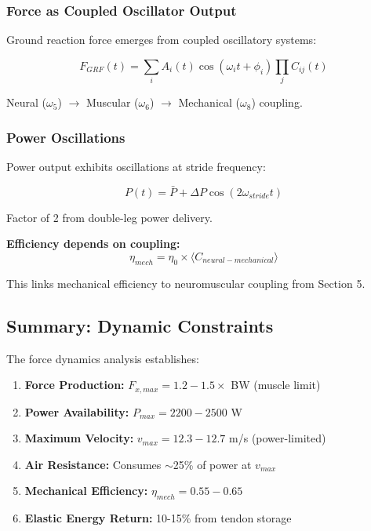 \subsubsection{Force as Coupled Oscillator Output}

Ground reaction force emerges from coupled oscillatory systems:

\begin{equation}
F_{GRF}(t) = \sum_i A_i(t) \cos(\omega_i t + \phi_i) \prod_{j} C_{ij}(t)
\label{eq:force_oscillatory}
\end{equation}

Neural ($\omega_5$) $\to$ Muscular ($\omega_6$) $\to$ Mechanical ($\omega_8$) coupling.

\subsubsection{Power Oscillations}

Power output exhibits oscillations at stride frequency:

\begin{equation}
P(t) = \bar{P} + \Delta P \cos(2\omega_{stride} t)
\label{eq:power_oscillations}
\end{equation}

Factor of 2 from double-leg power delivery.

\textbf{Efficiency depends on coupling:}
\begin{equation}
\eta_{mech} = \eta_0 \times \langle C_{neural-mechanical} \rangle
\label{eq:efficiency_coupling}
\end{equation}

This links mechanical efficiency to neuromuscular coupling from Section 5.

\subsection{Summary: Dynamic Constraints}

The force dynamics analysis establishes:

\begin{enumerate}
\item \textbf{Force Production:} $F_{x,max} = 1.2-1.5 \times$ BW (muscle limit)
\item \textbf{Power Availability:} $P_{max} = 2200-2500$ W
\item \textbf{Maximum Velocity:} $v_{max} = 12.3-12.7$ m/s (power-limited)
\item \textbf{Air Resistance:} Consumes $\sim$25\% of power at $v_{max}$
\item \textbf{Mechanical Efficiency:} $\eta_{mech} = 0.55-0.65$
\item \textbf{Elastic Energy Return:} 10-15\% from tendon storage
\end{enumerate}


